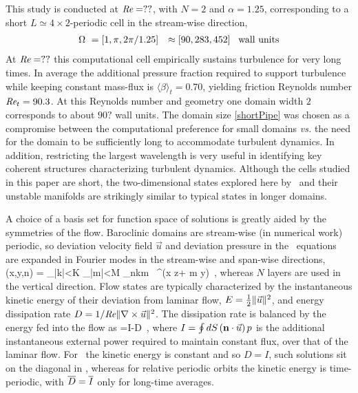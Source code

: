 This study is conducted at $\textit{Re} = ??$, with $N=2$ and
$\alpha=1.25$, corresponding to a short $L\simeq 4\times 2$-periodic
cell in
the stream-wise direction,
\begin{align}
\Omega~ &= [1,\pi,2\pi/1.25] &\approx [90, 283, 452] \;\;\;
\text{wall units}
    \label{shortPipe}
\end{align}
At
$\textit{Re} = ??$ this computational cell empirically sustains
turbulence for very long times. In average the additional pressure
fraction required to support turbulence while keeping constant mass-flux
is $\langle\beta\rangle_t=0.70$, yielding friction Reynolds number
$\textit{Re}_{t}=90.3$.  At this Reynolds number and geometry one domain
width $2$ corresponds to about $90?$ wall units. The domain size
\eqref{shortPipe} was chosen as a compromise between the computational
preference for small domains {\em vs.} the need for the domain to be
sufficiently long to accommodate turbulent dynamics. In addition,
restricting the largest wavelength is very useful in identifying key
coherent structures characterizing turbulent dynamics.
Although the cells studied in this paper are short, the two-dimensional
states explored here  by \eqva\ and their unstable manifolds are
strikingly similar to typical states in longer domains.


A choice of a basis set for function space of solutions is greatly aided
by the symmetries of the flow. Baroclinic domains are stream-wise (in
numerical work) periodic, so deviation velocity field $\vec{u}$ and
deviation pressure in the \NS\ equations  are
expanded in Fourier modes in the stream-wise and span-wise directions,
\beq
{}(x,y,n) = \sum_{|k|<K} \sum_{|m|<M} _{nkm}
\, ^{(\alpha x z+ m y)}
\,,
whereas $N$ layers are used in the vertical direction.
Flow states are typically characterized by the instantaneous kinetic
energy of their deviation from laminar flow, $E = \frac{1}{2}
\|{\vec{u}}\|^2$, and energy dissipation rate $D =
1/\textit{Re}\|{{\boldmath \nabla} \times \vec{u}}\|^2$. The dissipation rate is
balanced by the energy fed into the flow as
\beq
{}=I-D
\,,
where
\(
I =\oint dS \, ({\bf n}\cdot\vec{u})\, p
\)
is the additional instantaneous external power required to maintain
constant flux, over that of the laminar flow.  For \reqva\ the kinetic
energy is constant and so $D=I$, such solutions sit on the diagonal in
, whereas for relative periodic orbits the kinetic
energy is time-periodic, with $\overline{D}=\overline{I}$ only for
long-time averages.

